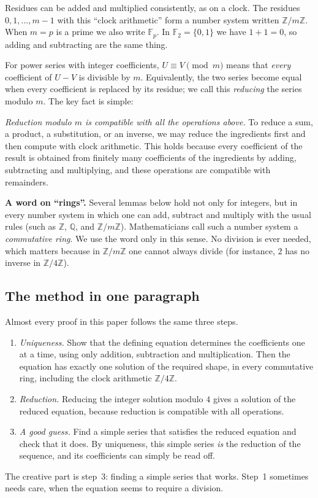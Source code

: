 \documentclass[11pt,a4paper]{article}
\theoremstyle{definition}
\theoremstyle{remark}
\newcommand{\Z}{\mathbb{Z}}
\newcommand{\Q}{\mathbb{Q}}
\newcommand{\F}{\mathbb{F}}
\newcommand{\para}[1]{\par\medskip\noindent\textbf{#1}\enspace}
\begin{document}
Residues can be added and multiplied consistently, as on a clock. The residues $0,1,\dots,m-1$ with this ``clock
arithmetic'' form a number system written $\Z/m\Z$. When $m=p$ is a prime we also write $\F_p$. In $\F_2=\{0,1\}$ we
have $1+1=0$, so adding and subtracting are the same thing.

For power series with integer coefficients, $U\equiv V\pmod m$ means that \emph{every} coefficient of $U-V$ is
divisible by $m$. Equivalently, the two series become equal when every coefficient is replaced by its residue; we call
this \emph{reducing} the series modulo $m$. The key fact is simple:

\emph{Reduction modulo $m$ is compatible with all the operations above.} To reduce a sum, a product, a substitution, or
an inverse, we may reduce the ingredients first and then compute with clock arithmetic. This holds because every
coefficient of the result is obtained from finitely many coefficients of the ingredients by adding, subtracting and
multiplying, and these operations are compatible with remainders.

\para{A word on ``rings''.} Several lemmas below hold not only for integers, but in every number system in
which one can add, subtract and multiply with the usual rules (such as $\Z$, $\Q$, and $\Z/m\Z$). Mathematicians call
such a number system a \emph{commutative ring}. We use the word only in this sense. No division is ever needed, which
matters because in $\Z/m\Z$ one cannot always divide (for instance, $2$ has no inverse in $\Z/4\Z$).

\subsection{The method in one paragraph}
Almost every proof in this paper follows the same three steps.
\begin{enumerate}
\item \emph{Uniqueness.} Show that the defining equation determines the coefficients one at a time, using only
addition, subtraction and multiplication. Then the equation has exactly one solution of the required shape, in every
commutative ring, including the clock arithmetic $\Z/4\Z$.
\item \emph{Reduction.} Reducing the integer solution modulo $4$ gives a solution of the reduced equation,
because reduction is compatible with all operations.
\item \emph{A good guess.} Find a simple series that satisfies the reduced equation and check that it does. By uniqueness,
this simple series \emph{is} the reduction of the sequence, and its coefficients can simply be read off.
\end{enumerate}
The creative part is step~3: finding a simple series that works. Step~1 sometimes needs care, when the equation seems to
require a division.
\end{document}
